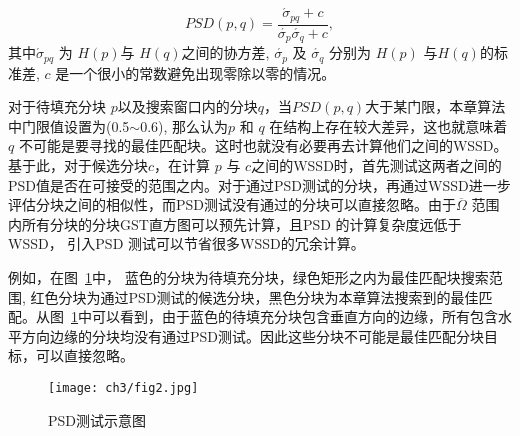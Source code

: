  $$PSD(p,q)=\frac{\acute{\sigma}_{pq}+c}{\acute{\sigma_p}\acute{\sigma_q}+c},$$
其中\(\acute{\sigma}_{pq}\) 为 \(H(p)\)与 \(H(q)\)之间的协方差, \(\acute{\sigma_p}\) 及 \(\acute{\sigma_q}\) 分别为 \(H(p)\) 与\(H(q)\)的标准差, \(c\) 是一个很小的常数避免出现零除以零的情况。\par
 对于待填充分块 \(p\)以及搜索窗口内的分块\(q\)，当\(PSD(p,q)\)大于某门限，本章算法中门限值设置为(0.5\(\sim\)0.6), 那么认为\(p\) 和 \(q\) 在结构上存在较大差异，这也就意味着\(q\) 不可能是要寻找的最佳匹配块。这时也就没有必要再去计算他们之间的WSSD。 基于此，对于候选分块\(c\)，在计算 \(p\) 与 \(c\)之间的WSSD时，首先测试这两者之间的PSD值是否在可接受的范围之内。对于通过PSD测试的分块，再通过WSSD进一步评估分块之间的相似性，而PSD测试没有通过的分块可以直接忽略。由于\(\overline{\Omega}\) 范围内所有分块的分块GST直方图可以预先计算，且PSD 的计算复杂度远低于WSSD， 引入PSD 测试可以节省很多WSSD的冗余计算。\par
例如，在图~\ref{chap03:fig:PSD}中， 蓝色的分块为待填充分块，绿色矩形之内为最佳匹配块搜索范围, 红色分块为通过PSD测试的候选分块，黑色分块为本章算法搜索到的最佳匹配。从图~\ref{chap03:fig:PSD}中可以看到，由于蓝色的待填充分块包含垂直方向的边缘，所有包含水平方向边缘的分块均没有通过PSD测试。因此这些分块不可能是最佳匹配分块目标，可以直接忽略。
 \begin{figure}[!htbp]
 	\begin{center}
 			\texttt{[image: ch3/fig2.jpg]}
 	\end{center}
     \caption{PSD测试示意图}
 	\label{chap03:fig:PSD}
 \end{figure}


